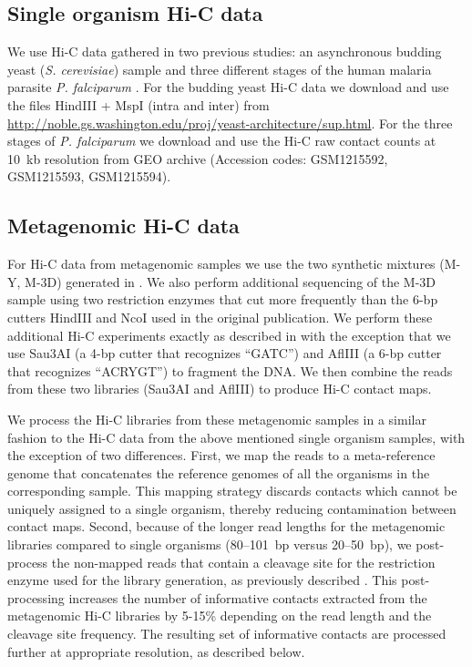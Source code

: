\subsection{Single organism Hi-C data}
We use Hi-C data gathered in two previous studies: an asynchronous budding yeast
(\textit{S. cerevisiae}) sample \cite{duan:three} and three different stages of
the human malaria parasite \textit{P. falciparum} \cite{ay:three-dimensional}.
For the budding yeast Hi-C data we download and use the files HindIII + MspI
(intra and inter)
from \url{http://noble.gs.washington.edu/proj/yeast-architecture/sup.html}.
For the three stages of \textit{P. falciparum} we download and use the Hi-C raw contact counts
at 10~kb resolution from GEO archive (Accession codes: GSM1215592, GSM1215593, GSM1215594).

\subsection{Metagenomic Hi-C data}
For Hi-C data from metagenomic samples we use the two synthetic mixtures (M-Y, M-3D)
generated in \citep{burton:species-level}. We also perform additional
sequencing of the M-3D sample using two restriction enzymes that cut more frequently than
the 6-bp cutters HindIII and NcoI used in the original publication. We perform these
additional Hi-C experiments exactly as described in \citep{burton:species-level}
with the exception that we use Sau3AI (a 4-bp cutter that recognizes ``GATC'') and AflIII
(a 6-bp cutter that recognizes ``ACRYGT'') to fragment the DNA. We then combine the reads
from these two libraries (Sau3AI and AflIII) to produce
Hi-C contact maps.

We process the Hi-C libraries from these metagenomic samples in a
similar fashion to the 
Hi-C data from the above mentioned single organism samples, with the exception of two differences.
First, we map the reads to a meta-reference genome that concatenates the reference genomes
of all the organisms in the corresponding sample. This mapping strategy discards contacts
which cannot be uniquely assigned to a single organism, thereby reducing contamination
between contact maps. Second, because of the longer read lengths
for the metagenomic libraries compared to single organisms (80--101~bp versus 20--50~bp), we
post-process the non-mapped reads that contain a cleavage site for the restriction enzyme
used for the library generation, as previously described \cite{ay:identifying}. This post-processing
increases the number of informative contacts extracted from the metagenomic Hi-C libraries by
5-15\% depending on the read length and the cleavage site frequency. The resulting set of
informative contacts are processed further at appropriate resolution, as described below.


